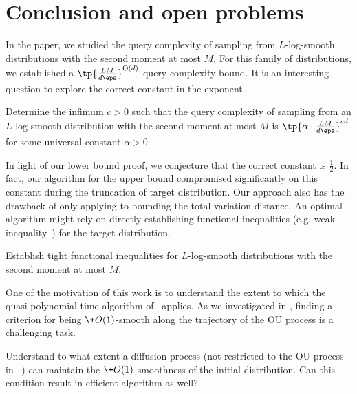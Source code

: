 \documentclass[11pt,a4paper]{article}
\begin{document}








\section{Conclusion and open problems}

In the paper, we studied the query complexity of sampling from $L$-log-smooth distributions with the second moment at most $M$. For this family of distributions, we established a $\tp{\frac{LM}{d\eps}}^{\Theta(d)}$ query complexity bound. It is an interesting question to explore the correct constant in the exponent. 
\begin{problem}
    Determine the infimum $c>0$ such that the query complexity of sampling from an $L$-log-smooth distribution with the second moment at most $M$ is $\tp{\alpha\cdot \frac{LM}{d\eps}}^{cd}$ for some universal constant $\alpha>0$.
\end{problem}
In light of our lower bound proof, we conjecture that the correct constant is $\frac{1}{2}$. In fact, our algorithm for the upper bound compromised significantly on this constant during the truncation of target distribution. Our approach also has the drawback of only applying to bounding the total variation distance. An optimal algorithm might rely on directly establishing functional inequalities (e.g. weak \Poincare inequality~\cite{HMRW24}) for the target distribution.

\begin{problem}
    Establish tight functional inequalities for $L$-log-smooth distributions with the second moment at most $M$.
\end{problem}

One of the motivation of this work is to understand the extent to which the quasi-polynomial time algorithm of~\cite{HZD+24} applies. As we investigated in , finding a criterion for being $\+O(1)$-smooth along the trajectory of the OU process is a challenging task.

\begin{problem}
    Understand to what extent a diffusion process (not restricted to the OU process in ~\cite{HZD+24}) can maintain the $\+O(1)$-smoothness of the initial distribution. Can this condition result in efficient algorithm as well?
\end{problem}
\end{document}
